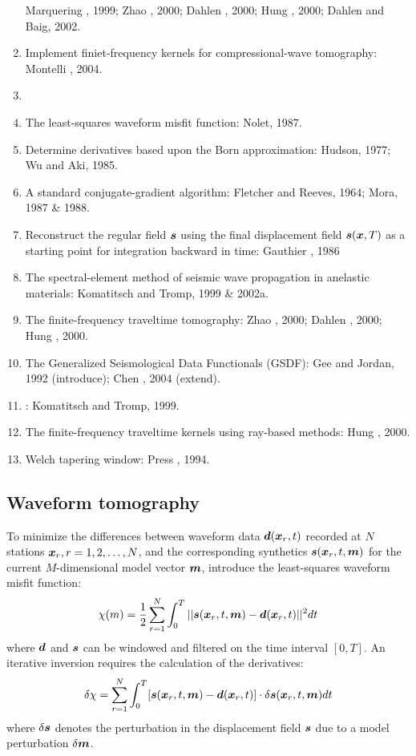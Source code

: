 \begin{enumerate}[\hspace{10mm}*]
    Marquering \etal, 1999; Zhao \etal, 2000; Dahlen \etal, 2000;
    Hung \etal, 2000; Dahlen and Baig, 2002.
  \item Implement finiet-frequency kernels for compressional-wave tomography: Montelli \etal, 2004.
  \item \sline
  \item The least-squares waveform misfit function: Nolet, 1987.
  \item Determine \Frechet derivatives based upon the Born approximation:
    Hudson, 1977; Wu and Aki, 1985.
  \item A standard conjugate-gradient algorithm: Fletcher and Reeves, 1964; Mora, 1987 \& 1988.
  \item Reconstruct the regular field $\boldsymbol{s}$ using the final displacement field $\boldsymbol{s}(\boldsymbol{x},T)$
    as a starting point for integration backward in time: Gauthier \etal, 1986
  \item The spectral-element method of seismic wave propagation in anelastic materials:
    Komatitsch and Tromp, 1999 \& 2002a.
  \item The finite-frequency traveltime tomography:
    Zhao \etal, 2000; Dahlen \etal, 2000; Hung \etal, 2000.
  \item The Generalized Seismological Data Functionals (GSDF):
    Gee and Jordan, 1992 (introduce); Chen \etal, 2004 (extend).
  \item {}: Komatitsch and Tromp, 1999.
  \item The finite-frequency traveltime kernels using ray-based methods: Hung \etal, 2000.
  \item Welch tapering window: Press \etal, 1994.
\end{enumerate}

\subsection{Waveform tomography}
To minimize the differences between waveform data $\boldsymbol{d}(\boldsymbol{x}_r,t)$
recorded at $N$ stations $\boldsymbol{x}_r,r=1,2,\ldots,N$,
and the corresponding synthetics $\boldsymbol{s}(\boldsymbol{x}_r,t,\boldsymbol{m})$
for the current $M$-dimensional model vector $\boldsymbol{m}$,
introduce the least-squares waveform misfit function:
\[ \chi(m)=\frac{1}{2}\sum_{r=1}^N\int_0^T||\boldsymbol{s}(\boldsymbol{x}_r,t,\boldsymbol{m})-\boldsymbol{d}(\boldsymbol{x}_r,t)||^2dt \]
where $\boldsymbol{d}$ and $\boldsymbol{s}$ can be windowed and filtered on the time interval $[0,T]$.
An iterative inversion requires the calculation of the \Frechet derivatives:
\[ \delta\chi=\sum_{r=1}^N\int_0^T[\boldsymbol{s}(\boldsymbol{x}_r,t,\boldsymbol{m})-\boldsymbol{d}(\boldsymbol{x}_r,t)]\cdot\delta\boldsymbol{s}(\boldsymbol{x}_r,t,\boldsymbol{m})dt \]
where $\delta\boldsymbol{s}$ denotes the perturbation in the displacement field $\boldsymbol{s}$
due to a model perturbation $\delta\boldsymbol{m}$.

